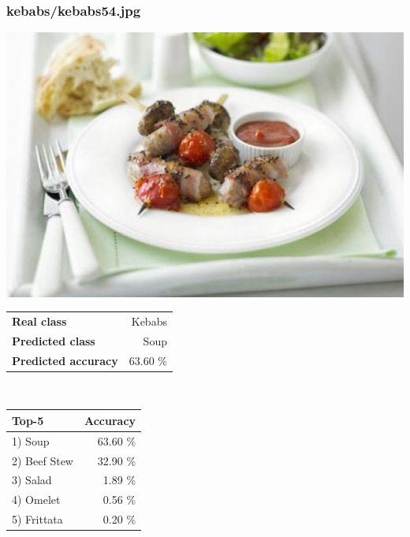 \subsubsection{kebabs/kebabs54.jpg}

\begin{minipage}[t]{0.4\textwidth}
	\vspace{0pt}
	\includegraphics[width=\linewidth]{images/evaluation-images/kebabs/kebabs54.jpg}
\end{minipage}
\hfill
\begin{minipage}[t]{0.5\textwidth}
	\vspace{0pt}\raggedright
	\begin{tabularx}{\textwidth}{X r}
		\small \textbf{Real class} & \small Kebabs\\
		\small \textbf{Predicted class} & \small Soup\\
		\small \textbf{Predicted accuracy} & \small 63.60 \%
    \end{tabularx}\\
    
    \vspace{6pt}
	\begin{tabularx}{\textwidth}{X r}
        \small \textbf{Top-5} & \small \textbf{Accuracy} \\
        \hline
		\small 1) Soup & \small 63.60 \%\\\small 2) Beef Stew & \small 32.90 \%\\\small 3) Salad & \small 1.89 \%\\\small 4) Omelet & \small 0.56 \%\\\small 5) Frittata & \small 0.20 \%
    \end{tabularx}
\end{minipage}
    
